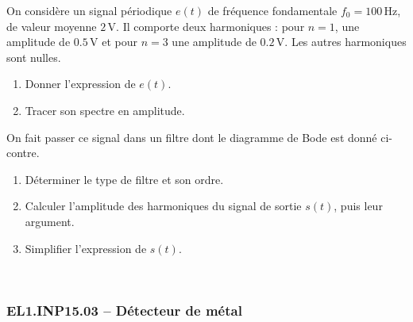 On considère un signal périodique $e(t)$ de fréquence fondamentale $f_0 = 100\, \text{Hz}$, de valeur moyenne $2\, \text{V}$. Il comporte deux harmoniques : pour $n = 1$, une amplitude de $0.5\, \text{V}$ et pour $n = 3$ une amplitude de $0.2\, \text{V}$. Les autres harmoniques sont nulles.





\begin{minipage}[t]{0.4\textwidth} %

\begin{enumerate}
    \item Donner l'expression de $e(t)$.
    \item Tracer son spectre en amplitude.
\end{enumerate}

On fait passer ce signal dans un filtre dont le diagramme de Bode est donné ci-contre.

\begin{enumerate}[resume]
    
    \item Déterminer le type de filtre et son ordre.
    \item Calculer l'amplitude des harmoniques du signal de sortie $s(t)$, puis leur argument.
    \item Simplifier l'expression de $s(t)$.
\end{enumerate}

\end{minipage}
\hfill %
\begin{minipage}[t]{0.55\textwidth} %
~
\vspace{-1em}




\end{minipage}


\newpage
\subsubsection*{EL1.INP15.03 -- Détecteur de métal  \lesdeux}

